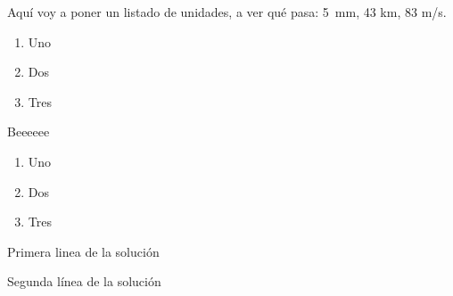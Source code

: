 \documentclass[
]{article}
\providecommand{\tightlist}{%
  \setlength{\itemsep}{0pt}\setlength{\parskip}{0pt}}
\begin{document}
\begin{exercise}Aquí voy a poner un listado de unidades, a ver qué pasa:
5~mm, 43 km, 83 m/s.

\begin{enumerate}
\def\labelenumi{\alph{enumi})}
\tightlist
\item
  Uno
\item
  Dos
\item
  Tres
\end{enumerate}

\end{exercise}

\begin{solution}Beeeeee\end{solution}

\begin{exercise}

\begin{enumerate}
\def\labelenumi{\alph{enumi})}
\tightlist
\item
  Uno
\item
  Dos
\item
  Tres
\end{enumerate}

\end{exercise}

\begin{solution}Primera linea de la solución

Segunda línea de la solución\end{solution}
\end{document}

